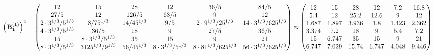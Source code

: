\documentclass[10pt,a4paper]{article}
\begin{document}
	\[
		\left(\bold{B_1^{(1)}}\right)^{2} = 
		\begin{pmatrix}
			{{12}}{} & {{15}}{} & {{28}}{} & {{12}}{} & {{36}} / {{5}} & {{84}} / {{5}} \\
			{{27}} / {{5}} & {{12}}{} & {{126}} / {{5}} & {{63}} / {{5}} & {{9}}{} & {{12}}{} \\
			{{2} \cdot {3^ {1 / 3}}} / {{5^ {1 / 3}}} & {{8}} / {{75^ {1 / 3}}} & {{14}} / {{45^ {1 / 3}}} & {{9}} / {{5}} & {{2} \cdot {9^ {1 / 3}}} / {{25^ {1 / 3}}} & {{14} \cdot {3^ {1 / 3}}} / {{625^ {1 / 3}}} \\
			{{4} \cdot {3^ {1 / 3}}} / {{5^ {1 / 3}}} & {{36}} / {{5}} & {{18}}{} & {{9}}{} & {{27}} / {{5}} & {{36}} / {{5}} \\
			{{15}}{} & {{8} \cdot {3^ {1 / 3}}} / {{5^ {1 / 3}}} & {{35}}{} & {{15}}{} & {{9}}{} & {{21}}{} \\
			{{8} \cdot {3^ {1 / 3}}} / {{5^ {1 / 3}}} & {{3125^ {1 / 3}}} / {{9^ {1 / 3}}} & {{56}} / {{45^ {1 / 3}}} & {{8} \cdot {3^ {1 / 3}}} / {{5^ {1 / 3}}} & {{8} \cdot {81^ {1 / 3}}} / {{625^ {1 / 3}}} & {{56} \cdot {3^ {1 / 3}}} / {{625^ {1 / 3}}} \\
		\end{pmatrix}
		\approx
		\begin{pmatrix}
			12       & 15       & 28       & 12       & 7.2      & 16.8     \\
			5.4      & 12       & 25.2     & 12.6     & 9        & 12       \\
			1.687    & 1.897    & 3.936    & 1.8      & 1.423    & 2.362    \\
			3.374    & 7.2      & 18       & 9        & 5.4      & 7.2      \\
			15       & 6.747    & 35       & 15       & 9        & 21       \\
			6.747    & 7.029    & 15.74    & 6.747    & 4.048    & 9.446    \\
		\end{pmatrix}
	\]
\end{document}
